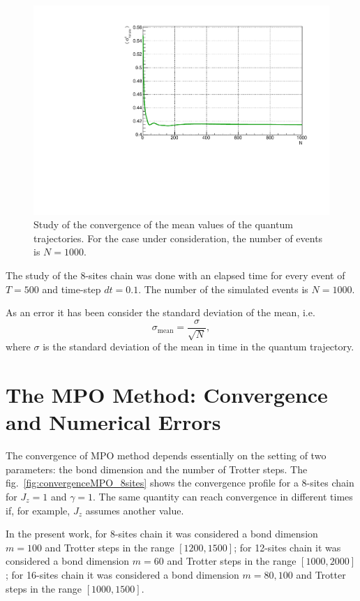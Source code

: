 \begin{figure}[H]
    \centering
    \includegraphics[scale=0.7]{Figures/Convergence_s8J1051.pdf}
    \captionsetup{width=1.\linewidth}
    \caption{Study of the convergence of the mean values of the quantum trajectories. For the case under consideration, the number of events is $N = 1000$.}
    \label{fig:Convergence_s8J1051}
\end{figure}

The study of the 8-sites chain was done with an elapsed time for every event of $T = 500$ and time-step $dt = 0.1$. The number of the simulated events is $N = 1000$.

As an error it has been consider the standard deviation of the mean, i.e.
\begin{equation*}
    \sigma_{\text{mean}} = \frac{\sigma}{\sqrt{N}},
\end{equation*}
where $\sigma$ is the standard deviation of the mean in time in the quantum trajectory.

\section{The MPO Method: Convergence and Numerical Errors}
The convergence of MPO method depends essentially on the setting of two parameters: the bond dimension and the number of Trotter steps. The fig.~\ref{fig:convergenceMPO_8sites} shows the convergence profile for a 8-sites chain for $J_z = 1$ and $\gamma = 1$. The same quantity can reach convergence in different times if, for example, $J_z$ assumes another value. 

In the present work, for 8-sites chain it was considered a bond dimension $m = 100$ and Trotter steps in the range $[1200, 1500]$; for 12-sites chain it was considered a bond dimension $m = 60$ and Trotter steps in the range $[1000, 2000]$; for 16-sites chain it was considered a bond dimension $m = 80, 100$ and Trotter steps in the range $[1000, 1500]$.

